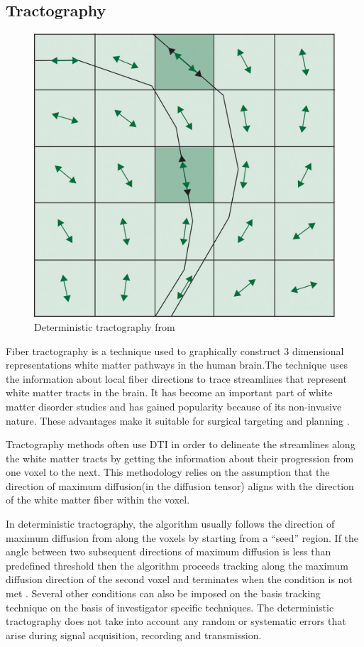 \documentclass[msthesis.tex]{subfiles}
\begin{document}
\subsection{Tractography}
\label{sub:tractography}
\begin{figure}
    \centering
    \includegraphics{images/fibertracking.png}
    \caption{Deterministic tractography from }
    \label{fig:tracking}
\end{figure}
Fiber tractography is a technique used to graphically construct  3 dimensional representations white matter pathways in the human brain.The technique uses the information about local fiber directions to trace streamlines that represent white matter tracts in the brain. It has become an important part of white matter disorder studies and has gained popularity because of its non-invasive nature. These advantages make it suitable for surgical targeting and planning \cite{romano2009pre}.

Tractography methods often use DTI in order to delineate the streamlines along the white matter tracts by getting the information about their progression from one voxel to the next. This methodology relies on the assumption that the direction of maximum diffusion(in the diffusion tensor) aligns with the direction of the white matter fiber within the voxel. 

In deterministic tractography, the algorithm usually follows the direction of maximum diffusion from along the voxels by starting from a “seed” region. If the angle between two subsequent directions of maximum diffusion is less than predefined threshold then the algorithm proceeds tracking along the maximum diffusion direction of the second voxel and terminates when the condition is not met \cite{}.  Several other conditions can also be imposed on the basis tracking technique on the basis of investigator specific techniques. The deterministic tractography does not take into account any random or systematic errors that arise during signal acquisition, recording and transmission.
\end{document}
